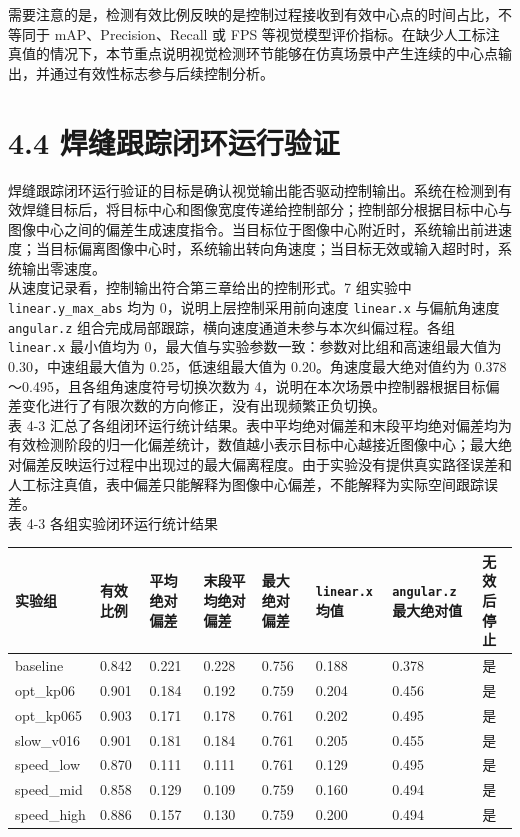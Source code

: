 \documentclass[UTF8,a4paper,12pt]{ctexrep}
\begin{document}
需要注意的是，检测有效比例反映的是控制过程接收到有效中心点的时间占比，不等同于 mAP、Precision、Recall 或 FPS 等视觉模型评价指标。在缺少人工标注真值的情况下，本节重点说明视觉检测环节能够在仿真场景中产生连续的中心点输出，并通过有效性标志参与后续控制分析。\\

\section{4.4 焊缝跟踪闭环运行验证}

焊缝跟踪闭环运行验证的目标是确认视觉输出能否驱动控制输出。系统在检测到有效焊缝目标后，将目标中心和图像宽度传递给控制部分；控制部分根据目标中心与图像中心之间的偏差生成速度指令。当目标位于图像中心附近时，系统输出前进速度；当目标偏离图像中心时，系统输出转向角速度；当目标无效或输入超时时，系统输出零速度。\\

从速度记录看，控制输出符合第三章给出的控制形式。7 组实验中 \texttt{linear.y\_max\_abs} 均为 0，说明上层控制采用前向速度 \texttt{linear.x} 与偏航角速度 \texttt{angular.z} 组合完成局部跟踪，横向速度通道未参与本次纠偏过程。各组 \texttt{linear.x} 最小值均为 0，最大值与实验参数一致：参数对比组和高速组最大值为 0.30，中速组最大值为 0.25，低速组最大值为 0.20。角速度最大绝对值约为 0.378～0.495，且各组角速度符号切换次数为 4，说明在本次场景中控制器根据目标偏差变化进行了有限次数的方向修正，没有出现频繁正负切换。\\

表 4-3 汇总了各组闭环运行统计结果。表中平均绝对偏差和末段平均绝对偏差均为有效检测阶段的归一化偏差统计，数值越小表示目标中心越接近图像中心；最大绝对偏差反映运行过程中出现过的最大偏离程度。由于实验没有提供真实路径误差和人工标注真值，表中偏差只能解释为图像中心偏差，不能解释为实际空间跟踪误差。\\

表 4-3 各组实验闭环运行统计结果\\

\begin{longtable}{|p{}|p{}|p{}|p{}|p{}|p{}|p{}|p{}|}
\hline
实验组 & 有效比例 & 平均绝对偏差 & 末段平均绝对偏差 & 最大绝对偏差 & \texttt{linear.x} 均值 & \texttt{angular.z} 最大绝对值 & 无效后停止 \\ \hline
baseline & 0.842 & 0.221 & 0.228 & 0.756 & 0.188 & 0.378 & 是 \\ \hline
opt\_kp06 & 0.901 & 0.184 & 0.192 & 0.759 & 0.204 & 0.456 & 是 \\ \hline
opt\_kp065 & 0.903 & 0.171 & 0.178 & 0.761 & 0.202 & 0.495 & 是 \\ \hline
slow\_v016 & 0.901 & 0.181 & 0.184 & 0.761 & 0.205 & 0.455 & 是 \\ \hline
speed\_low & 0.870 & 0.111 & 0.111 & 0.761 & 0.129 & 0.495 & 是 \\ \hline
speed\_mid & 0.858 & 0.129 & 0.109 & 0.759 & 0.160 & 0.494 & 是 \\ \hline
speed\_high & 0.886 & 0.157 & 0.130 & 0.759 & 0.200 & 0.494 & 是 \\ \hline
\end{longtable}
\end{document}

